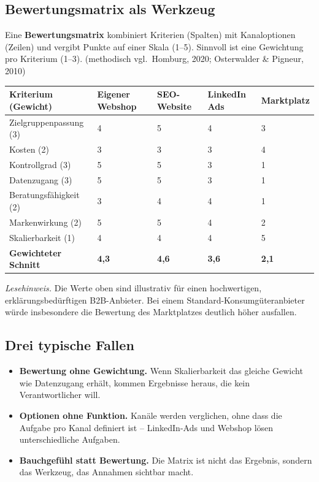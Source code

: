 \documentclass[11pt,a4paper,oneside]{article}
\newcommand{\fachbegriff}[1]{\textbf{#1}}
\newcommand{\quelle}[1]{{\footnotesize\color{lpGray}(#1)}}
\begin{document}
\subsection{Bewertungsmatrix als Werkzeug}

Eine \fachbegriff{Bewertungsmatrix} kombiniert Kriterien (Spalten) mit Kanaloptionen (Zeilen) und vergibt Punkte auf einer Skala (1--5). Sinnvoll ist eine Gewichtung pro Kriterium (1--3). \quelle{methodisch vgl.\ Homburg, 2020; Osterwalder \& Pigneur, 2010}

\begin{tabularx}{\linewidth}{@{}lXXXX@{}}
\toprule
\textbf{Kriterium (Gewicht)} & \textbf{Eigener Webshop} & \textbf{SEO-Website} & \textbf{LinkedIn Ads} & \textbf{Marktplatz} \\
\midrule
Zielgruppenpassung (3) & 4 & 5 & 4 & 3 \\
Kosten (2)             & 3 & 3 & 3 & 4 \\
Kontrollgrad (3)       & 5 & 5 & 3 & 1 \\
Datenzugang (3)        & 5 & 5 & 3 & 1 \\
Beratungsfähigkeit (2) & 3 & 4 & 4 & 1 \\
Markenwirkung (2)      & 5 & 5 & 4 & 2 \\
Skalierbarkeit (1)     & 4 & 4 & 4 & 5 \\
\midrule
\textbf{Gewichteter Schnitt} & \textbf{4{,}3} & \textbf{4{,}6} & \textbf{3{,}6} & \textbf{2{,}1} \\
\bottomrule
\end{tabularx}

\medskip

\noindent\emph{Lesehinweis.} Die Werte oben sind illustrativ für einen hochwertigen, erklärungsbedürftigen B2B-Anbieter. Bei einem Standard-Konsumgüteranbieter würde insbesondere die Bewertung des Marktplatzes deutlich höher ausfallen.

\subsection{Drei typische Fallen}

\begin{itemize}
  \item \textbf{Bewertung ohne Gewichtung.} Wenn Skalierbarkeit das gleiche Gewicht wie Datenzugang erhält, kommen Ergebnisse heraus, die kein Verantwortlicher will.
  \item \textbf{Optionen ohne Funktion.} Kanäle werden verglichen, ohne dass die Aufgabe pro Kanal definiert ist -- LinkedIn-Ads und Webshop lösen unterschiedliche Aufgaben.
  \item \textbf{Bauchgefühl statt Bewertung.} Die Matrix ist nicht das Ergebnis, sondern das Werkzeug, das Annahmen sichtbar macht.
\end{itemize}
\end{document}
